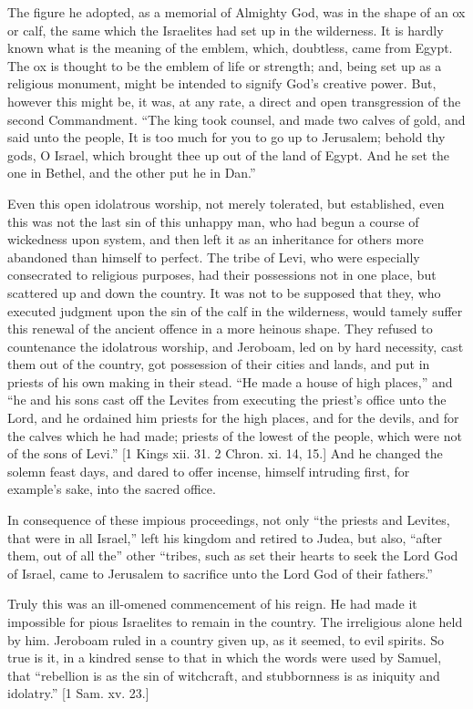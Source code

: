 The figure he adopted, as a memorial of Almighty God, was in the
shape of an ox or calf, the same which the Israelites had set up in
the wilderness. It is hardly known what is the meaning of the emblem,
which, doubtless, came from Egypt. The ox is thought to be the emblem
of life or strength; and, being set up as a religious monument, might
be intended to signify God's creative power. But, however this
might be, it was, at any rate, a direct and open transgression of the
second Commandment. ``The king took counsel, and made two calves
of gold, and said unto the people, It is too much for you to go up to
Jerusalem; behold thy gods, O Israel, which brought thee up out of the
land of Egypt. And he set the one in Bethel, and the other put he in
Dan.''

Even this open idolatrous worship, not merely tolerated, but
established, even this was not the last sin of this unhappy man, who
had begun a course of wickedness upon system, and then left it as an
inheritance for others more abandoned than himself to perfect. The
tribe of Levi, who were especially consecrated to religious purposes,
had their possessions not in one place, but scattered up and down the
country. It was not to be supposed that they, who executed judgment
upon the sin of the calf in the wilderness, would tamely suffer this
renewal of the ancient offence in a more heinous shape. They refused
to countenance the idolatrous worship, and Jeroboam, led on by hard
necessity, cast them out of the country, got possession of their
cities and lands, and put in priests of his own making in their stead.
``He made a house of high places,'' and ``he and his sons
cast off the Levites from executing the priest's office unto the
Lord, and he ordained him priests for the high places, and for the
devils, and for the calves which he had made; priests of the lowest of
the people, which were not of the sons of Levi.'' [1 Kings xii.
31. 2 Chron. xi. 14, 15.] And he changed the solemn feast days, and
dared to offer incense, himself intruding first, for example's sake,
into the sacred office.

In consequence of these impious proceedings, not only ``the
priests and Levites, that were in all Israel,'' left his kingdom
and retired to Judea, but also, ``after them, out of all the''
other ``tribes, such as set their hearts to seek the Lord God of
Israel, came to Jerusalem to sacrifice unto the Lord God of their
fathers.''

Truly this was an ill-omened commencement of his reign. He had made
it impossible for pious Israelites to remain in the country. The
irreligious alone held by him. Jeroboam ruled in a country given up,
as it seemed, to evil spirits. So true is it, in a kindred sense to
that in which the words were used by Samuel, that ``rebellion is
as the sin of witchcraft, and stubbornness is as iniquity and
idolatry.'' [1 Sam. xv. 23.]

